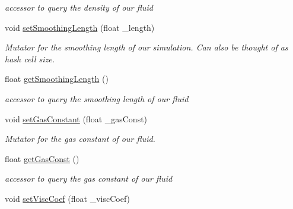 \begin{DoxyCompactItemize}
\begin{DoxyCompactList}\small\item\em accessor to query the density of our fluid \end{DoxyCompactList}\item 
\hypertarget{class_s_p_h_engine_a196e04ba23d9d9c73924f3af8a8240ed}{void \hyperlink{class_s_p_h_engine_a196e04ba23d9d9c73924f3af8a8240ed}{set\-Smoothing\-Length} (float \-\_\-length)}\label{class_s_p_h_engine_a196e04ba23d9d9c73924f3af8a8240ed}

\begin{DoxyCompactList}\small\item\em Mutator for the smoothing length of our simulation. Can also be thought of as hash cell size. \end{DoxyCompactList}\item 
\hypertarget{class_s_p_h_engine_a5eebbb4eaf3c773e263396d49a76fc3e}{float \hyperlink{class_s_p_h_engine_a5eebbb4eaf3c773e263396d49a76fc3e}{get\-Smoothing\-Length} ()}\label{class_s_p_h_engine_a5eebbb4eaf3c773e263396d49a76fc3e}

\begin{DoxyCompactList}\small\item\em accessor to query the smoothing length of our fluid \end{DoxyCompactList}\item 
\hypertarget{class_s_p_h_engine_a293fc06859e21473b03626a55c5c3a69}{void \hyperlink{class_s_p_h_engine_a293fc06859e21473b03626a55c5c3a69}{set\-Gas\-Constant} (float \-\_\-gas\-Const)}\label{class_s_p_h_engine_a293fc06859e21473b03626a55c5c3a69}

\begin{DoxyCompactList}\small\item\em Mutator for the gas constant of our fluid. \end{DoxyCompactList}\item 
\hypertarget{class_s_p_h_engine_a683d29b540672f364c306b304bd50ea7}{float \hyperlink{class_s_p_h_engine_a683d29b540672f364c306b304bd50ea7}{get\-Gas\-Const} ()}\label{class_s_p_h_engine_a683d29b540672f364c306b304bd50ea7}

\begin{DoxyCompactList}\small\item\em accessor to query the gas constant of our fluid \end{DoxyCompactList}\item 
\hypertarget{class_s_p_h_engine_a296c06a01cb0a93dfa150c3acea64493}{void \hyperlink{class_s_p_h_engine_a296c06a01cb0a93dfa150c3acea64493}{set\-Visc\-Coef} (float \-\_\-visc\-Coef)}\label{class_s_p_h_engine_a296c06a01cb0a93dfa150c3acea64493}


\end{DoxyCompactItemize}
